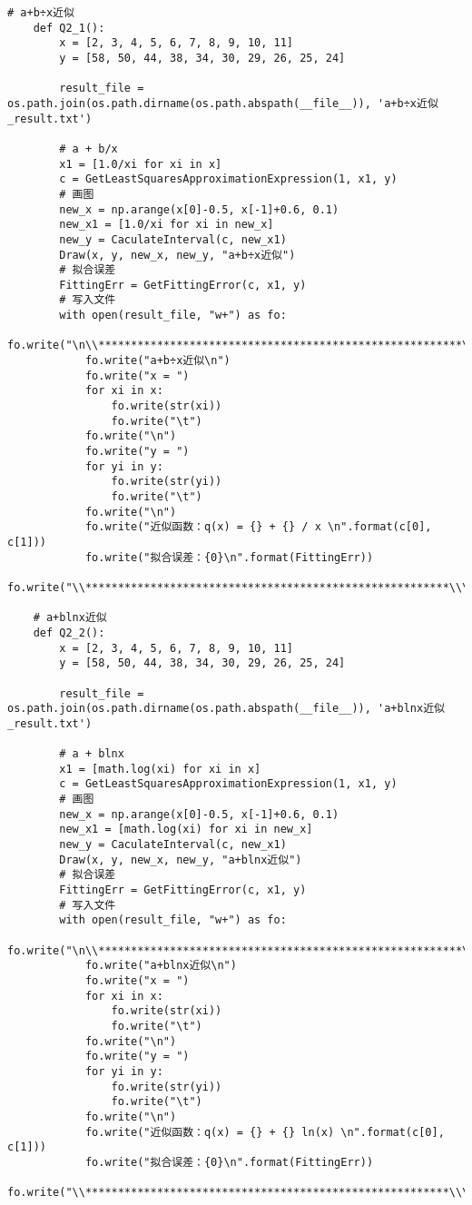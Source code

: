 \begin{lstlisting}[style = python]
    # a+b÷x近似
    def Q2_1():
        x = [2, 3, 4, 5, 6, 7, 8, 9, 10, 11]
        y = [58, 50, 44, 38, 34, 30, 29, 26, 25, 24]

        result_file = os.path.join(os.path.dirname(os.path.abspath(__file__)), 'a+b÷x近似_result.txt')

        # a + b/x
        x1 = [1.0/xi for xi in x]
        c = GetLeastSquaresApproximationExpression(1, x1, y)
        # 画图
        new_x = np.arange(x[0]-0.5, x[-1]+0.6, 0.1)
        new_x1 = [1.0/xi for xi in new_x]
        new_y = CaculateInterval(c, new_x1)
        Draw(x, y, new_x, new_y, "a+b÷x近似")
        # 拟合误差
        FittingErr = GetFittingError(c, x1, y)
        # 写入文件
        with open(result_file, "w+") as fo:
            fo.write("\n\\********************************************************\\\n")
            fo.write("a+b÷x近似\n")
            fo.write("x = ")
            for xi in x:
                fo.write(str(xi))
                fo.write("\t")
            fo.write("\n")
            fo.write("y = ")
            for yi in y:
                fo.write(str(yi))
                fo.write("\t")
            fo.write("\n")
            fo.write("近似函数：q(x) = {} + {} / x \n".format(c[0], c[1]))
            fo.write("拟合误差：{0}\n".format(FittingErr))
            fo.write("\\********************************************************\\\n")

    # a+blnx近似
    def Q2_2():
        x = [2, 3, 4, 5, 6, 7, 8, 9, 10, 11]
        y = [58, 50, 44, 38, 34, 30, 29, 26, 25, 24]

        result_file = os.path.join(os.path.dirname(os.path.abspath(__file__)), 'a+blnx近似_result.txt')

        # a + blnx
        x1 = [math.log(xi) for xi in x]
        c = GetLeastSquaresApproximationExpression(1, x1, y)
        # 画图
        new_x = np.arange(x[0]-0.5, x[-1]+0.6, 0.1)
        new_x1 = [math.log(xi) for xi in new_x]
        new_y = CaculateInterval(c, new_x1)
        Draw(x, y, new_x, new_y, "a+blnx近似")
        # 拟合误差
        FittingErr = GetFittingError(c, x1, y)
        # 写入文件
        with open(result_file, "w+") as fo:
            fo.write("\n\\********************************************************\\\n")
            fo.write("a+blnx近似\n")
            fo.write("x = ")
            for xi in x:
                fo.write(str(xi))
                fo.write("\t")
            fo.write("\n")
            fo.write("y = ")
            for yi in y:
                fo.write(str(yi))
                fo.write("\t")
            fo.write("\n")
            fo.write("近似函数：q(x) = {} + {} ln(x) \n".format(c[0], c[1]))
            fo.write("拟合误差：{0}\n".format(FittingErr))
            fo.write("\\********************************************************\\\n")


\end{lstlisting}
